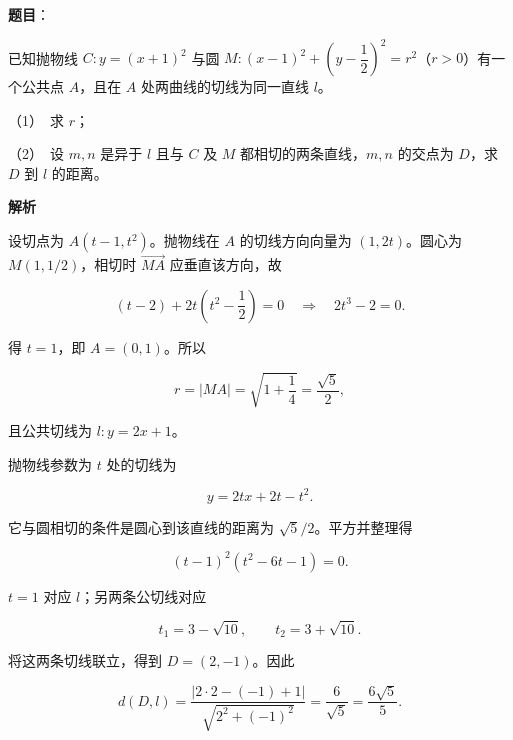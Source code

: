 \begin{answer}

\textbf{题目}：

已知抛物线 $C:y=(x+1)^2$ 与圆 $M:(x-1)^2+\left(y-\dfrac12\right)^2=r^2$（$r>0$）有一个公共点 $A$，且在 $A$ 处两曲线的切线为同一直线 $l$。

（1）　求 $r$；

（2）　设 $m,n$ 是异于 $l$ 且与 $C$ 及 $M$ 都相切的两条直线，$m,n$ 的交点为 $D$，求 $D$ 到 $l$ 的距离。

\textbf{解析}


设切点为 $A(t-1,t^2)$。抛物线在 $A$ 的切线方向向量为 $(1,2t)$。圆心为 $M(1,1/2)$，相切时 $\overrightarrow{MA}$ 应垂直该方向，故

\nopagebreak[4]
\[
(t-2)+2t\left(t^2-\frac12\right)=0
\quad\Longrightarrow\quad 2t^3-2=0.
\]

得 $t=1$，即 $A=(0,1)$。所以

\nopagebreak[4]
\[
r=|MA|=\sqrt{1+\frac14}=\frac{\sqrt5}{2},
\]

且公共切线为 $l:y=2x+1$。


抛物线参数为 $t$ 处的切线为

\nopagebreak[4]
\[
y=2tx+2t-t^2.
\]

它与圆相切的条件是圆心到该直线的距离为 $\sqrt5/2$。平方并整理得

\nopagebreak[4]
\[
(t-1)^2(t^2-6t-1)=0.
\]

$t=1$ 对应 $l$；另两条公切线对应

\nopagebreak[4]
\[
t_1=3-\sqrt{10},\qquad t_2=3+\sqrt{10}.
\]

将这两条切线联立，得到 $D=(2,-1)$。因此

\nopagebreak[4]
\[
d(D,l)=\frac{|2\cdot2-(-1)+1|}{\sqrt{2^2+(-1)^2}}
=\frac6{\sqrt5}=\frac{6\sqrt5}{5}.
\]



\end{answer}